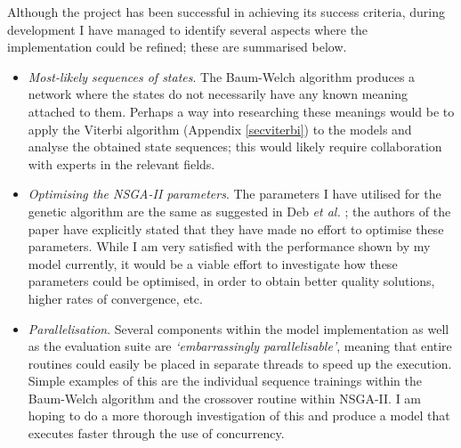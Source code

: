 \documentclass[12pt,a4paper,twoside,openright]{report}
\begin{document}
Although the project has been successful in achieving its success criteria, during development I have managed to identify several aspects where the implementation could be refined; these are summarised below.%
\begin{itemize}
	\item \emph{Most-likely sequences of states}. The Baum-Welch algorithm produces a network where the states do not necessarily have any known meaning attached to them. Perhaps a way into researching these meanings would be to apply the Viterbi algorithm (Appendix \ref{secviterbi}) to the models and analyse the obtained state sequences; this would likely require collaboration with experts in the relevant fields.
	\item \emph{Optimising the NSGA-II parameters}. The parameters I have utilised for the genetic algorithm are the same as suggested in Deb \emph{et al.} \cite{deb2002fast}; the authors of the paper have explicitly stated that they have made no effort to optimise these parameters. While I am very satisfied with the performance shown by my model currently, it would be a viable effort to investigate how these parameters could be optimised, in order to obtain better quality solutions, higher rates of convergence, etc.
	\item \emph{Parallelisation}. Several components within the model implementation as well as the evaluation suite are \emph{`embarrassingly parallelisable'}, meaning that entire routines could easily be placed in separate threads to speed up the execution. Simple examples of this are the individual sequence trainings within the Baum-Welch algorithm and the crossover routine within NSGA-II. I am hoping to do a more thorough investigation of this and produce a model that executes faster through the use of concurrency.
\end{itemize}



\end{document}
